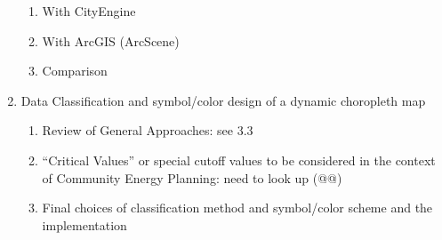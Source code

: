 \documentclass[hidelinks,12pt]{article}
\begin{document}
\begin{enumerate}[label*=\arabic*.]
\begin{enumerate}[label*=\arabic*.]
      \item With CityEngine
      \item With ArcGIS (ArcScene)
      \item Comparison
      \end{enumerate}
  \item Data Classification and symbol/color design of a dynamic
    choropleth map
    \begin{enumerate}[label*=\arabic*.]
    \item Review of General Approaches: see 3.3
    \item ``Critical Values'' or special cutoff values to be
      considered in the context of Community Energy Planning: need to
      look up (@@)
    \item Final choices of classification method and symbol/color
      scheme and the implementation
    \end{enumerate}
  \end{enumerate}
\end{document}

